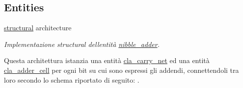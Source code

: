 \subsection*{Entities}
\begin{DoxyCompactItemize}
\item 
\hyperlink{classnibble__adder_1_1structural}{structural} architecture
\begin{DoxyCompactList}\small\item\em Implementazione structural dell\textquotesingle{}entità \hyperlink{classnibble__adder}{nibble\+\_\+adder}.

Questa architettura istanzia una entità \hyperlink{classcla__carry__net}{cla\+\_\+carry\+\_\+net} ed una entità \hyperlink{classcla__adder__cell}{cla\+\_\+adder\+\_\+cell} per ogni bit su cui sono espressi gli addendi, connettendoli tra loro secondo lo schema riportato di seguito\+: . \end{DoxyCompactList}\end{DoxyCompactItemize}
